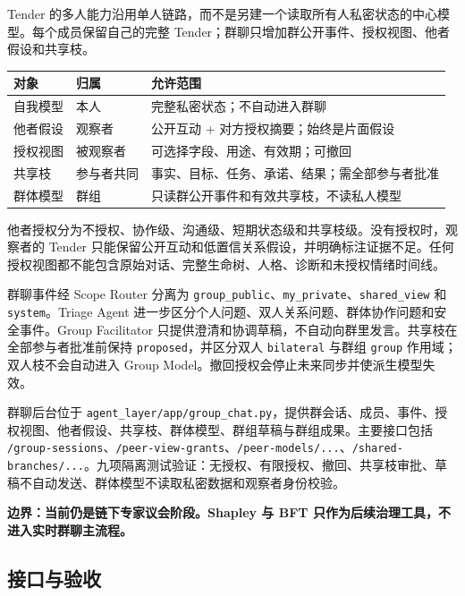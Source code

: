 \documentclass[UTF8,a4paper,11pt]{ctexart}
\newcommand{\warn}[1]{\textcolor{red!70!black}{\textbf{#1}}}
\begin{document}
Tender 的多人能力沿用单人链路，而不是另建一个读取所有人私密状态的中心模型。每个成员保留自己的完整 Tender；群聊只增加群公开事件、授权视图、他者假设和共享枝。

\begin{center}
\begin{longtable}{@{}p{3.1cm}p{4.5cm}p{5.4cm}@{}}
\toprule
\textbf{对象} & \textbf{归属} & \textbf{允许范围} \\
\midrule
自我模型 & 本人 & 完整私密状态；不自动进入群聊 \\
他者假设 & 观察者 & 公开互动 + 对方授权摘要；始终是片面假设 \\
授权视图 & 被观察者 & 可选择字段、用途、有效期；可撤回 \\
共享枝 & 参与者共同 & 事实、目标、任务、承诺、结果；需全部参与者批准 \\
群体模型 & 群组 & 只读群公开事件和有效共享枝，不读私人模型 \\
\bottomrule
\end{longtable}
\end{center}

他者授权分为不授权、协作级、沟通级、短期状态级和共享枝级。没有授权时，观察者的 Tender 只能保留公开互动和低置信关系假设，并明确标注证据不足。任何授权视图都不能包含原始对话、完整生命树、人格、诊断和未授权情绪时间线。

群聊事件经 Scope Router 分离为 \texttt{group\_public}、\texttt{my\_private}、\texttt{shared\_view} 和 \texttt{system}。Triage Agent 进一步区分个人问题、双人关系问题、群体协作问题和安全事件。Group Facilitator 只提供澄清和协调草稿，不自动向群里发言。共享枝在全部参与者批准前保持 \texttt{proposed}，并区分双人 \texttt{bilateral} 与群组 \texttt{group} 作用域；双人枝不会自动进入 Group Model。撤回授权会停止未来同步并使派生模型失效。

群聊后台位于 \texttt{agent\_layer/app/group\_chat.py}，提供群会话、成员、事件、授权视图、他者假设、共享枝、群体模型、群组草稿与群组成果。主要接口包括 \texttt{/group-sessions}、\texttt{/peer-view-grants}、\texttt{/peer-models/...}、\texttt{/shared-branches/...}。九项隔离测试验证：无授权、有限授权、撤回、共享枝审批、草稿不自动发送、群体模型不读取私密数据和观察者身份校验。

\warn{边界：当前仍是链下专家议会阶段。Shapley 与 BFT 只作为后续治理工具，不进入实时群聊主流程。}

\subsection{接口与验收}
\end{document}
